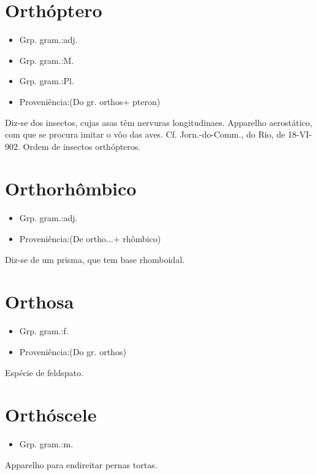 \section{Orthóptero}
\begin{itemize}
\item {Grp. gram.:adj.}
\end{itemize}
\begin{itemize}
\item {Grp. gram.:M.}
\end{itemize}
\begin{itemize}
\item {Grp. gram.:Pl.}
\end{itemize}
\begin{itemize}
\item {Proveniência:(Do gr. \textunderscore orthos\textunderscore  + \textunderscore pteron\textunderscore )}
\end{itemize}
Diz-se dos insectos, cujas asas têm nervuras longitudinaes.
Apparelho aerostático, com que se procura imitar o vôo das aves. Cf. \textunderscore Jorn.-do-Comm.\textunderscore , do Rio, de 18-VI-902.
Ordem de insectos orthópteros.
\section{Orthorhômbico}
\begin{itemize}
\item {Grp. gram.:adj.}
\end{itemize}
\begin{itemize}
\item {Proveniência:(De \textunderscore ortho...\textunderscore  + \textunderscore rhômbico\textunderscore )}
\end{itemize}
Diz-se de um prisma, que tem base rhomboidal.
\section{Orthosa}
\begin{itemize}
\item {Grp. gram.:f.}
\end{itemize}
\begin{itemize}
\item {Proveniência:(Do gr. \textunderscore orthos\textunderscore )}
\end{itemize}
Espécie de feldspato.
\section{Orthóscele}
\begin{itemize}
\item {Grp. gram.:m.}
\end{itemize}
Apparelho para endireitar pernas tortas.
